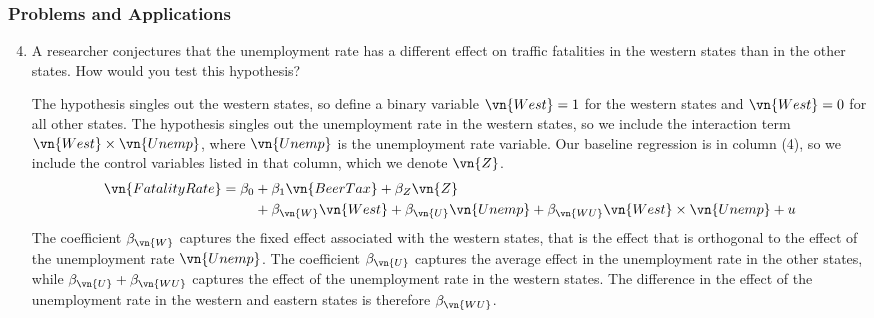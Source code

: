 \begin{frame}
\frametitle{Problems and Applications}

\begin{enumerate}\setcounter{enumi}{3}

\item A researcher conjectures that the unemployment rate has a different effect on traffic fatalities in the western states than in the other states. How would you test this hypothesis?

\begin{answer}
The hypothesis singles out the western states, so define a binary variable $\vn{West}=1$ for the western states and $\vn{West}=0$ for all other states. The hypothesis singles out the unemployment rate in the western states, so we include the interaction term $\vn{West}\times\vn{Unemp}$, where $\vn{Unemp}$ is the unemployment rate variable. Our baseline regression is in column (4), so we include the control variables listed in that column, which we denote $\vn{Z}$. 
\begin{align*}
\vn{FatalityRate}
  = \beta_{0} 
& + \beta_{1} \vn{BeerTax} 
  + \beta_{Z} \vn{Z} \\
& + \beta_{\vn{W}} \vn{West} 
  + \beta_{\vn{U}} \vn{Unemp} 
  + \beta_{\vn{WU}} \vn{West}\times\vn{Unemp}
  + u
\end{align*}
The coefficient $\beta_{\vn{W}}$ captures the fixed effect associated with the western states, that is the effect that is orthogonal to the effect of the unemployment rate $\vn{Unemp}$.
The coefficient $\beta_{\vn{U}}$ captures the average effect in the unemployment rate in the other states, while $\beta_{\vn{U}}+\beta_{\vn{WU}}$ captures the effect of the unemployment rate in the western states. The difference in the effect of the unemployment rate in the western and eastern states is therefore $\beta_{\vn{WU}}$.
\end{answer}

\end{enumerate}

\end{frame}


